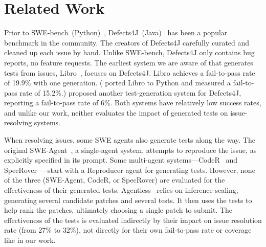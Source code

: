 \section{Related Work}
\label{sec:related}


Prior to SWE-bench~(Python)~\cite{jimenezswe},
Defects4J~(Java)~\cite{just2014defects4j} has been a popular benchmark
in the community.
The creators of Defects4J carefully curated and cleaned up each issue
by hand.
Unlike SWE-bench, Defects4J only contains bug reports, no feature
requests.
The earliest system we are aware of that generates tests from issues,
Libro~\cite{kang2023large}, focuses on Defects4J.
Libro achieves a fail-to-pass rate of 19.9\% with one generation.
(\citet{mundler2024swtbench} ported Libro to Python and measured a
fail-to-pass rate of 15.2\%.)
\citet{plein_et_al_2024} proposed another test-generation system for
Defects4J, reporting a fail-to-pass rate of 6\%.
Both systems have relatively low success rates, and
unlike our work, neither evaluates the impact of generated tests on
issue-resolving systems.

When resolving issues, some SWE agents also generate tests along the
way.
The original
SWE-Agent~\cite{sweagent2}, a single-agent system, attempts to reproduce the issue,
as explicitly specified in its prompt.
Some multi-agent systems---CodeR~\cite{sweagent3coder} and SpecRover~\cite{autocoderover2}---start with a Reproducer agent for generating tests.
However, none of the three (SWE-Agent, CodeR, or SpecRover)
are evaluated for the effectiveness of their generated tests.
Agentless~\cite{sweagent5agentless} relies on inference
scaling, generating several candidate patches and several
tests.
It then uses the tests to help rank the patches, ultimately choosing a
single patch to submit.
The effectiveness of the tests is evaluated indirectly by their impact
on issue resolution rate (from 27\% to 32\%), not directly for their
own fail-to-pass rate or coverage like in our work.

